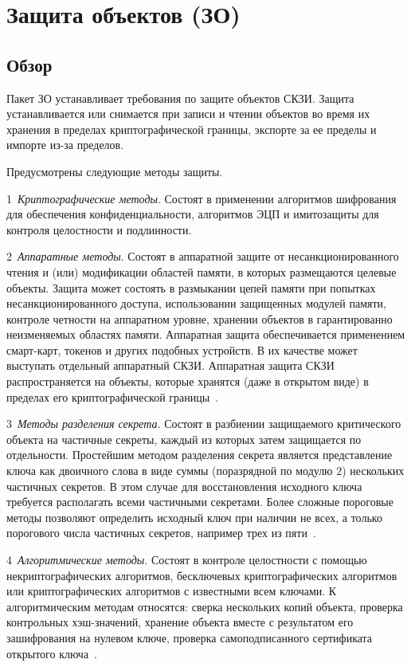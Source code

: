 \section{Защита объектов (ЗО)}\label{DP}

\subsection{Обзор}\label{DP.Defs}

Пакет ЗО устанавливает требования по защите объектов СКЗИ. 
Защита устанавливается или снимается при записи и чтении объектов 
во время их хранения в пределах криптографической границы, экспорте за ее 
пределы и импорте из-за пределов. 

Предусмотрены следующие методы защиты.

1~{\it Криптографические методы}. 
Состоят в применении алгоритмов шифрования для обеспечения конфиденциальности, 
алгоритмов ЭЦП и имитозащиты для контроля целостности и подлинности.

2~{\it Аппаратные методы}. 
Состоят в аппаратной защите от несанкционированного чтения и (или) модификации
областей памяти, в которых размещаются целевые объекты. 
%
Защита может состоять в размыкании цепей памяти при попытках 
несанкционированного доступа, использовании защищенных модулей памяти, 
контроле четности на аппаратном уровне, хранении объектов в гарантированно 
неизменяемых областях памяти.
%
Аппаратная защита обеспечивается применением смарт-карт, токенов и других
подобных устройств. В их качестве может выступать отдельный аппаратный СКЗИ.
%
Аппаратная защита СКЗИ распространяется на объекты, которые хранятся 
(даже в открытом виде) в пределах его криптографической границы~.

3~{\it Методы разделения секрета}. 
Состоят в разбиении защищаемого критического объекта на частичные секреты, 
каждый из которых затем защищается по отдельности.
%
Простейшим методом разделения секрета является представление
ключа как двоичного слова в виде суммы (поразрядной по модулю $2$)
нескольких частичных секретов. 
В этом случае для восстановления исходного 
ключа требуется располагать всеми частичными секретами.
%
Более сложные пороговые методы позволяют 
определить исходный ключ при наличии не всех, 
а только порогового числа частичных секретов, 
например трех из пяти~.

4~{\it Алгоритмические методы}. 
Состоят в контроле целостности с помощью некриптографических
алгоритмов, бесключевых криптографических алгоритмов
или криптографических алгоритмов с известными всем ключами.
%
К алгоритмическим методам относятся: 
сверка нескольких копий объекта, 
проверка контрольных хэш-значений,
хранение объекта вместе с результатом его зашифрования на нулевом ключе,
проверка самоподписанного сертификата открытого ключа~.

